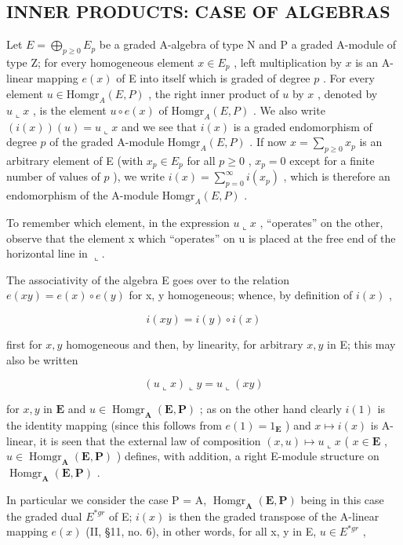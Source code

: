 \subsection{INNER PRODUCTS: CASE OF ALGEBRAS}

Let \(E = \bigoplus_{p \geqslant 0} E_p\) be a graded A-algebra of type N and P a graded A-module of type Z; for every homogeneous element \(x \in E_p\) , left multiplication by \(x\) is an A-linear mapping \(e(x)\) of E into itself which is graded of degree \(p\) . For every element \(u \in \text{Homgr}_A(E, P)\) , the right inner product of \(u\) by \(x\) , denoted by \(u \llcorner x\) , is the element \(u \circ e(x)\) of \(\text{Homgr}_A(E, P)\) . We also write \((i(x))(u) = u \llcorner x\) and we see that \(i(x)\) is a graded endomorphism of degree \(p\) of the graded A-module \(\text{Homgr}_A(E, P)\) . If now \(x = \sum_{p \geqslant 0} x_p\) is an arbitrary element of E (with \(x_p \in E_p\) for all \(p \geqslant 0\) , \(x_p = 0\) except for a finite number of values of \(p\) ), we write \(i(x) = \sum_{p=0}^{\infty} i(x_p)\) , which is therefore an endomorphism of the A-module \(\text{Homgr}_A(E, P)\) .

To remember which element, in the expression \(u \llcorner x\) , ``operates'' on the other, observe that the element x which ``operates'' on u is placed at the free end of the horizontal line in \(\llcorner\).

The associativity of the algebra E goes over to the relation \(e(xy) = e(x) \circ e(y)\) for x, y homogeneous; whence, by definition of \(i(x)\) ,

\[
i (x y) = i (y) \circ i (x)\tag{35}
\]

first for \(x, y\) homogeneous and then, by linearity, for arbitrary \(x, y\) in E; this may also be written

\[
(u \llcorner x) \llcorner y = u \llcorner (x y)\tag{36}
\]

for \(x, y\) in \(\mathbf{E}\) and \(u \in \operatorname{Homgr}_{\mathbf{A}}(\mathbf{E}, \mathbf{P})\) ; as on the other hand clearly \(i(1)\) is the identity mapping (since this follows from \(e(1) = 1_{\mathbf{E}}\) ) and \(x \mapsto i(x)\) is A-linear, it is seen that the external law of composition \((x, u) \mapsto u \llcorner x\) ( \(x \in \mathbf{E}\) , \(u \in \operatorname{Homgr}_{\mathbf{A}}(\mathbf{E}, \mathbf{P})\) ) defines, with addition, a right E-module structure on \(\operatorname{Homgr}_{\mathbf{A}}(\mathbf{E}, \mathbf{P})\) .

In particular we consider the case P = A, \(\operatorname{Homgr}_{\mathbf{A}}(\mathbf{E}, \mathbf{P})\) being in this case the graded dual \(E^{*gr}\) of E; \(i(x)\) is then the graded transpose of the A-linear mapping \(e(x)\) (II, §11, no. 6), in other words, for all x, y in E, \(u \in E^{*gr}\) ,

